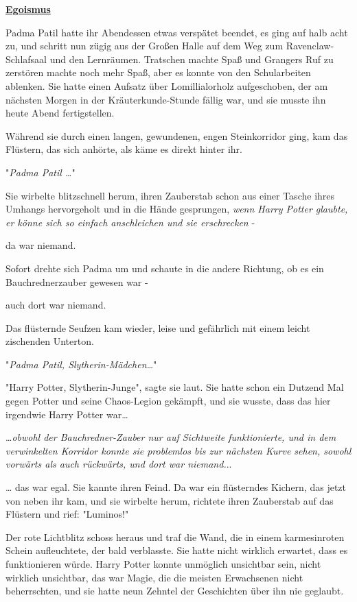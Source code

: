

\hypertarget{egoismus}{%

\textbf{\uline{Egoismus}}

Padma Patil hatte ihr Abendessen etwas verspätet beendet, es ging auf halb acht zu, und schritt nun zügig aus der Großen Halle auf dem Weg zum Ravenclaw-Schlafsaal und den Lernräumen. Tratschen machte Spaß und Grangers Ruf zu zerstören machte noch mehr Spaß, aber es konnte von den Schularbeiten ablenken. Sie hatte einen Aufsatz über Lomillialorholz aufgeschoben, der am nächsten Morgen in der Kräuterkunde-Stunde fällig war, und sie musste ihn heute Abend fertigstellen.

Während sie durch einen langen, gewundenen, engen Steinkorridor ging, kam das Flüstern, das sich anhörte, als käme es direkt hinter ihr.

"\emph{Padma Patil …}"

Sie wirbelte blitzschnell herum, ihren Zauberstab schon aus einer Tasche ihres Umhangs hervorgeholt und in die Hände gesprungen, \emph{wenn Harry Potter glaubte, er könne sich so einfach anschleichen und sie erschrecken} -

da war niemand.

Sofort drehte sich Padma um und schaute in die andere Richtung, ob es ein Bauchrednerzauber gewesen war -

auch dort war niemand.

Das flüsternde Seufzen kam wieder, leise und gefährlich mit einem leicht zischenden Unterton.

"\emph{Padma Patil, Slytherin-Mädchen…}"

"Harry Potter, Slytherin-Junge", sagte sie laut. Sie hatte schon ein Dutzend Mal gegen Potter und seine Chaos-Legion gekämpft, und sie wusste, dass das hier irgendwie Harry Potter war…

…\emph{obwohl der Bauchredner-Zauber nur auf Sichtweite funktionierte, und in dem verwinkelten Korridor konnte sie problemlos bis zur nächsten Kurve sehen, sowohl vorwärts als auch rückwärts, und dort war niemand.}..

… das war egal. Sie kannte ihren Feind. Da war ein flüsterndes Kichern, das jetzt von neben ihr kam, und sie wirbelte herum, richtete ihren Zauberstab auf das Flüstern und rief: "Luminos!"

Der rote Lichtblitz schoss heraus und traf die Wand, die in einem karmesinroten Schein aufleuchtete, der bald verblasste. Sie hatte nicht wirklich erwartet, dass es funktionieren würde. Harry Potter konnte unmöglich unsichtbar sein, nicht wirklich unsichtbar, das war Magie, die die meisten Erwachsenen nicht beherrschten, und sie hatte neun Zehntel der Geschichten über ihn nie geglaubt.

}
